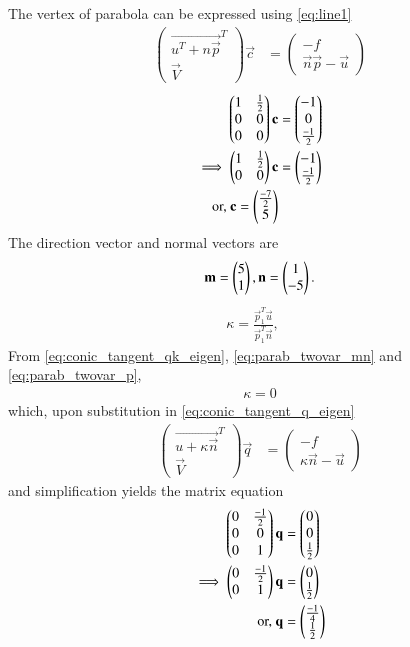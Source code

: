 \documentclass[journal,12pt,twocolumn]{IEEEtran}
\begin{document}
The vertex of parabola can be expressed using \eqref{eq:line1}
\begin{align}
\label{eq:vertex}
\begin{pmatrix}
\vec{u^T+n \vec{p}}^T \\ \vec{V}
\end{pmatrix}
\vec{c} &= 
\begin{pmatrix}
-f
\\
\vec{n}\vec{p}-\vec{u}
\end{pmatrix}
\end{align}
\begin{align}
\begin{pmatrix} 1 & \frac{1}{2} \\ 0 & 0 \\ 0 & 0\end{pmatrix}\mathbf{c} &= \begin{pmatrix}-1 \\ 0\\\frac{-1}{2}\end{pmatrix} 
\\
\implies 
\begin{pmatrix} 1 & \frac{1}{2} \\  0 & 0\end{pmatrix}\mathbf{c} &= \begin{pmatrix}-1 \\ \frac{-1}{2}\end{pmatrix} 
\\
\text{or, } \mathbf{c} = \begin{pmatrix}\frac{-7}{2}\\5\end{pmatrix}
\end{align}
The direction vector and normal vectors are
\begin{align}
\mathbf{m} = \begin{pmatrix}5\\1\end{pmatrix}, \mathbf{n} = \begin{pmatrix}1\\-5\end{pmatrix}.
\label{eq:parab_twovar_mn}
\end{align}
\begin{align}
\label{eq:conic_tangent_qk_eigen} \kappa = \frac{\vec{p}_1^T\vec{u}}{\vec{p}_1^T\vec{n}}, \quad 
\end{align}
From \eqref{eq:conic_tangent_qk_eigen}, \eqref{eq:parab_twovar_mn} and \eqref{eq:parab_twovar_p},
\begin{align}
\kappa = 0
\end{align}
which, upon substitution in  \eqref{eq:conic_tangent_q_eigen}
\begin{align}
\label{eq:conic_tangent_q_eigen}
\begin{pmatrix}
\vec{u+\kappa \vec{n}}^T \\ \vec{V}
\end{pmatrix}
\vec{q} &= 
\begin{pmatrix}
-f
\\
\kappa\vec{n}-\vec{u}
\end{pmatrix}
\end{align}
and simplification yields the matrix equation
\begin{align}
\begin{pmatrix}0 & \frac{-1}{2}\\0 & 0\\0&1\end{pmatrix}\mathbf{q} &= \begin{pmatrix}0\\0\\\frac{1}{2}\end{pmatrix}
\\
\implies \begin{pmatrix}0 & \frac{-1}{2}\\0&1\end{pmatrix}\mathbf{q} &= \begin{pmatrix}0\\\frac{1}{2}\end{pmatrix}
\\
\text{or, } \mathbf{q} &= \begin{pmatrix}\frac{-1}{4}\\\frac{1}{2}\end{pmatrix}
\end{align}
\end{document}
